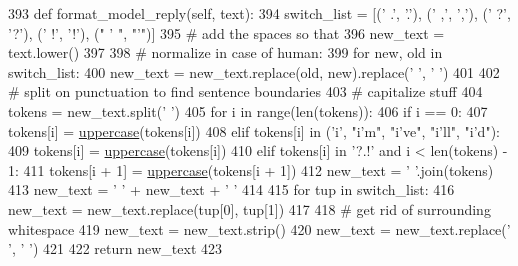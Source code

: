 \begin{DoxyCode}
393     \textcolor{keyword}{def }format\_model\_reply(self, text):
394         switch\_list = [(\textcolor{stringliteral}{' .'}, \textcolor{stringliteral}{'.'}), (\textcolor{stringliteral}{' ,'}, \textcolor{stringliteral}{','}), (\textcolor{stringliteral}{' ?'}, \textcolor{stringliteral}{'?'}), (\textcolor{stringliteral}{' !'}, \textcolor{stringliteral}{'!'}), (\textcolor{stringliteral}{" ' "}, \textcolor{stringliteral}{"'"})]
395         \textcolor{comment}{# add the spaces so that}
396         new\_text = text.lower()
397 
398         \textcolor{comment}{# normalize in case of human:}
399         \textcolor{keywordflow}{for} new, old \textcolor{keywordflow}{in} switch\_list:
400             new\_text = new\_text.replace(old, new).replace(\textcolor{stringliteral}{'  '}, \textcolor{stringliteral}{' '})
401 
402         \textcolor{comment}{# split on punctuation to find sentence boundaries}
403         \textcolor{comment}{# capitalize stuff}
404         tokens = new\_text.split(\textcolor{stringliteral}{' '})
405         \textcolor{keywordflow}{for} i \textcolor{keywordflow}{in} range(len(tokens)):
406             \textcolor{keywordflow}{if} i == 0:
407                 tokens[i] = \hyperlink{namespaceprojects_1_1controllable__dialogue_1_1mturk_1_1worlds_a661f3cc70180bbd2379e66e5844f7900}{uppercase}(tokens[i])
408             \textcolor{keywordflow}{elif} tokens[i] \textcolor{keywordflow}{in} (\textcolor{stringliteral}{'i'}, \textcolor{stringliteral}{"i'm"}, \textcolor{stringliteral}{"i've"}, \textcolor{stringliteral}{"i'll"}, \textcolor{stringliteral}{"i'd"}):
409                 tokens[i] = \hyperlink{namespaceprojects_1_1controllable__dialogue_1_1mturk_1_1worlds_a661f3cc70180bbd2379e66e5844f7900}{uppercase}(tokens[i])
410             \textcolor{keywordflow}{elif} tokens[i] \textcolor{keywordflow}{in} \textcolor{stringliteral}{'?.!'} \textcolor{keywordflow}{and} i < len(tokens) - 1:
411                 tokens[i + 1] = \hyperlink{namespaceprojects_1_1controllable__dialogue_1_1mturk_1_1worlds_a661f3cc70180bbd2379e66e5844f7900}{uppercase}(tokens[i + 1])
412         new\_text = \textcolor{stringliteral}{' '}.join(tokens)
413         new\_text = \textcolor{stringliteral}{' '} + new\_text + \textcolor{stringliteral}{' '}
414 
415         \textcolor{keywordflow}{for} tup \textcolor{keywordflow}{in} switch\_list:
416             new\_text = new\_text.replace(tup[0], tup[1])
417 
418         \textcolor{comment}{# get rid of surrounding whitespace}
419         new\_text = new\_text.strip()
420         new\_text = new\_text.replace(\textcolor{stringliteral}{'  '}, \textcolor{stringliteral}{' '})
421 
422         \textcolor{keywordflow}{return} new\_text
423 
\end{DoxyCode}
